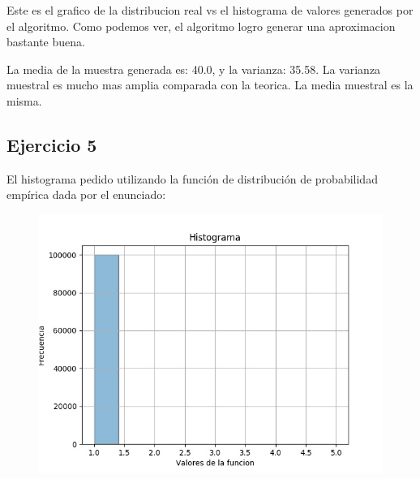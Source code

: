 \documentclass[11pt,a4paper]{article}
\begin{document}
	Este es el grafico de la distribucion real vs el histograma de valores generados por el algoritmo. 
	Como podemos ver, el algoritmo logro generar una aproximacion bastante buena. 

	La media de la muestra generada es: 40.0, y la varianza: 35.58.\newline
	La varianza muestral es mucho mas amplia comparada con la teorica. La media muestral es la misma.

	\subsection{Ejercicio 5}
		El histograma pedido utilizando la función de distribución de probabilidad empírica dada por el enunciado:
		\begin{figure}[H]
  			\centering
    			\includegraphics[width=14cm]{imagenes/histogramaEjer5}
		\end{figure}
\end{document}
